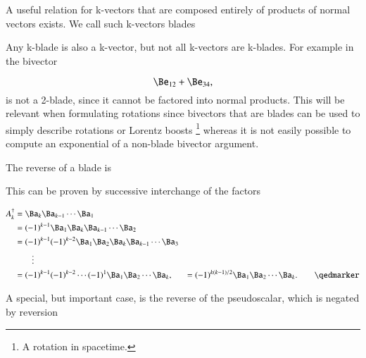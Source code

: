 %
%


A useful relation for k-vectors that are composed entirely of products of normal vectors exists.  We call such k-vectors blades


Any k-blade is also a k-vector, but not all k-vectors are k-blades.  For example in  the bivector

\begin{dmath}\label{eqn:reverse:3}
\Be_{12} + \Be_{34},
\end{dmath}
is not a 2-blade, since it cannot be factored into normal products.
This will be relevant when formulating rotations since bivectors that are blades can be used to simply describe rotations or Lorentz boosts
\footnote{A rotation in spacetime.} whereas it is not easily possible to compute an exponential of a non-blade bivector argument.

The reverse of a blade is


This can be proven by successive interchange of the factors

\begin{dmath}\label{eqn:reverse:81}
\begin{aligned}
A_k^\dagger
&= \Ba_k \Ba_{k-1} \cdots \Ba_1 \\
&= (-1)^{k-1} \Ba_1 \Ba_k \Ba_{k-1} \cdots \Ba_2 \\
&= (-1)^{k-1} (-1)^{k-2} \Ba_1 \Ba_2 \Ba_k \Ba_{k-1} \cdots \Ba_3 \\
&\qquad \vdots \\
&= (-1)^{k-1} (-1)^{k-2} \cdots (-1)^1 \Ba_1 \Ba_2 \cdots \Ba_k,
&= (-1)^{k(k-1)/2} \Ba_1 \Ba_2 \cdots \Ba_k. \qquad \qedmarker
\end{aligned}
\end{dmath}

A special, but important case, is the reverse of the  pseudoscalar, which is negated by reversion


